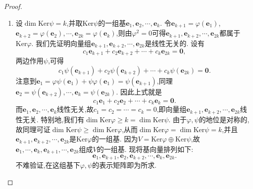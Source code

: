 \documentclass[../../main.tex]{subfiles}
\begin{document}
\begin{proof}
\begin{enumerate}[(1)]
\item 设\(\dim\text{Ker}\psi=k\),并取\(\text{Ker}\psi\)的一组基\(\boldsymbol{e}_1,\boldsymbol{e}_2,\cdots,\boldsymbol{e}_k\). 令\(\boldsymbol{e}_{k + 1}=\varphi(\boldsymbol{e}_1)\),\(\boldsymbol{e}_{k + 2}=\varphi(\boldsymbol{e}_2),\cdots,\boldsymbol{e}_{2k}=\varphi(\boldsymbol{e}_k)\),则由\(\varphi^2 = 0\)可得\(\boldsymbol{e}_{k + 1},\boldsymbol{e}_{k + 2},\cdots,\boldsymbol{e}_{2k}\)都属于\(\text{Ker}\varphi\). 我们先证明向量组\(\boldsymbol{e}_{k + 1},\boldsymbol{e}_{k + 2},\cdots,\boldsymbol{e}_{2k}\)是线性无关的. 设有
\[
c_1\boldsymbol{e}_{k + 1}+c_2\boldsymbol{e}_{k + 2}+\cdots + c_k\boldsymbol{e}_{2k}=\boldsymbol{0},
\]
两边作用\(\psi\),可得
\[
c_1\psi(\boldsymbol{e}_{k + 1})+c_2\psi(\boldsymbol{e}_{k + 2})+\cdots + c_k\psi(\boldsymbol{e}_{2k})=\boldsymbol{0}.
\]
注意到\(\boldsymbol{e}_1=\varphi\psi(\boldsymbol{e}_1)+\psi\varphi(\boldsymbol{e}_1)=\psi(\boldsymbol{e}_{k + 1})\),同理\(\boldsymbol{e}_2=\psi(\boldsymbol{e}_{k + 2}),\cdots,\boldsymbol{e}_k=\psi(\boldsymbol{e}_{2k})\). 因此上式就是
\[
c_1\boldsymbol{e}_1+c_2\boldsymbol{e}_2+\cdots + c_k\boldsymbol{e}_k=\boldsymbol{0}.
\]
而\(\boldsymbol{e}_1,\boldsymbol{e}_2,\cdots,\boldsymbol{e}_k\)线性无关,故\(c_1 = c_2=\cdots = c_k = 0\),即向量组\(\boldsymbol{e}_{k + 1},\boldsymbol{e}_{k + 2},\cdots,\boldsymbol{e}_{2k}\)线性无关. 特别地,我们有\(\dim\text{Ker}\varphi\geqslant  k=\dim\text{Ker}\psi\). 由于\(\varphi,\psi\)的地位是对称的,故同理可证\(\dim\text{Ker}\psi\geqslant \dim\text{Ker}\varphi\),从而\(\dim\text{Ker}\varphi=\dim\text{Ker}\psi = k\),并且\(\boldsymbol{e}_{k + 1},\boldsymbol{e}_{k + 2},\cdots,\boldsymbol{e}_{2k}\)是\(\text{Ker}\varphi\)的一组基. 因为\(V=\text{Ker}\varphi\oplus\text{Ker}\psi\),故\(\boldsymbol{e}_1,\cdots,\boldsymbol{e}_k,\boldsymbol{e}_{k + 1},\cdots,\boldsymbol{e}_{2k}\)组成\(V\)的一组基. 现将基向量排列如下:
\[
\boldsymbol{e}_1,\boldsymbol{e}_{k + 1},\boldsymbol{e}_2,\boldsymbol{e}_{k + 2},\cdots,\boldsymbol{e}_k,\boldsymbol{e}_{2k}.
\]
不难验证,在这组基下\(\varphi,\psi\)的表示矩阵即为所求.
\end{enumerate}
\end{proof}
\end{document}
